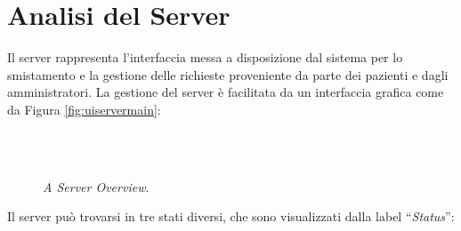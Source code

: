 \section{Analisi del Server}\label{sec:serveranalisys}


Il server rappresenta l'interfaccia messa a disposizione dal sistema
per lo smistamento e la gestione delle richieste proveniente da parte
dei pazienti e dagli amministratori. La gestione del server è facilitata
da un interfaccia grafica come da Figura \vref{fig:uiservermain}:

\begin{figure}[!b]
 \centering
   \\
   \\ 
 \caption{\emph{A Server Overview}.}
 \label{fig:uiservermain}
\end{figure}



Il server può trovarsi in tre stati diversi, che sono visualizzati
dalla label {}``\emph{Status}'':

